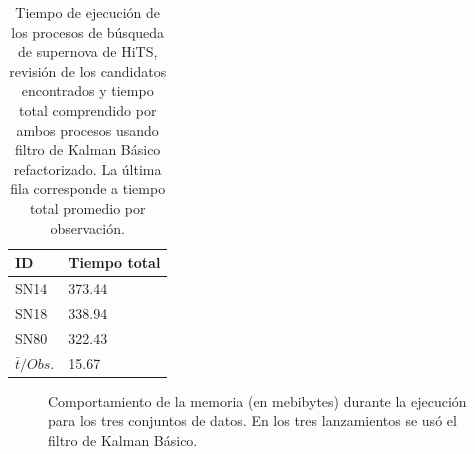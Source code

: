 \begin{table}[h!]
\centering
\begin{tabular}{|l|l|}
\hline
\textbf{ID} & \textbf{Tiempo total} \\ \hline
\hline
SN14  & 373.44 \\\hline
SN18  & 338.94\\\hline
SN80  & 322.43 \\\hline\hline
 $\bar{t}/Obs. $& 15.67 \\\hline 
\end{tabular}
\caption{Tiempo de ejecuci\'on de los procesos de b\'usqueda de supernova de HiTS, revisi\'on de los candidatos encontrados y tiempo total comprendido por ambos procesos usando filtro de Kalman B\'asico refactorizado. La \'ultima fila corresponde a tiempo total promedio por observaci\'on.}
\label{tab:t8}

\end{table}



\begin{figure}[h!]
\centering
{}\hfill
{}\vfill
{}
\caption{Comportamiento de la memoria (en mebibytes) durante la ejecuci\'on para los tres conjuntos de datos. En los tres lanzamientos se us\'o el filtro de Kalman B\'asico.}
\label{fig:mem_new_kbf}
\end{figure}

